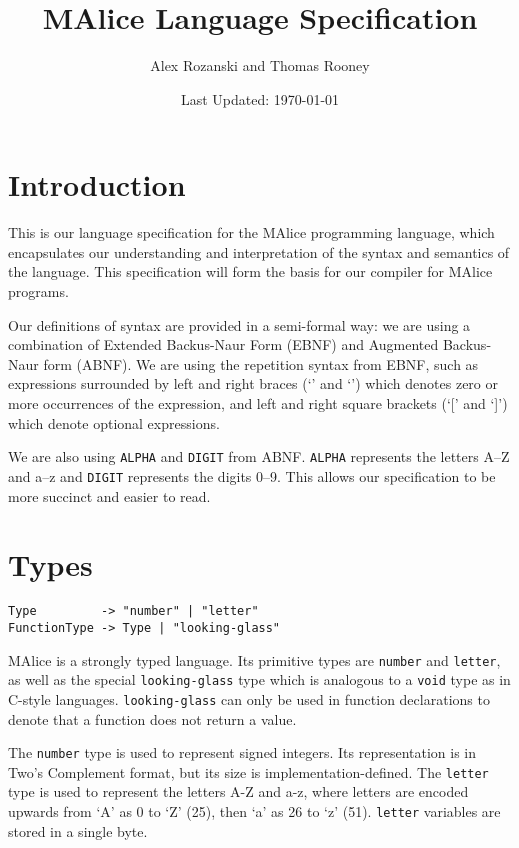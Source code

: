 \documentclass[a4wide, 11pt]{article}
\begin{document}
\title{MAlice Language Specification}

\author{Alex Rozanski and Thomas Rooney}

\date{Last Updated: \today}         %

\maketitle            %

\section{Introduction}

This is our language specification for the MAlice programming language, which encapsulates our understanding and interpretation of the syntax and semantics of the language. This specification will form the basis for our compiler for MAlice programs.

Our definitions of syntax are provided in a semi-formal way: we are using a combination of Extended Backus-Naur Form (EBNF) and Augmented Backus-Naur form (ABNF). We are using the repetition syntax from EBNF, such as expressions surrounded by left and right braces (`{' and `}') which denotes zero or more occurrences of the expression, and left and right square brackets (`[' and `]') which denote optional expressions.

We are also using \texttt{ALPHA} and \texttt{DIGIT} from ABNF. \texttt{ALPHA} represents the letters A--Z and a--z and \texttt{DIGIT} represents the digits 0--9. This allows our specification to be more succinct and easier to read.

\section{Types}

\begin{verbatim}
Type         -> "number" | "letter"
FunctionType -> Type | "looking-glass"
\end{verbatim}

MAlice is a strongly typed language. Its primitive types are \texttt{number} and \texttt{letter}, as well as the special \texttt{looking-glass} type which is analogous to a \texttt{void} type as in C-style languages. \texttt{looking-glass} can only be used in function declarations to denote that a function does not return a value.

The \texttt{number} type is used to represent signed integers. Its representation is in Two's Complement format, but its size is implementation-defined. The \texttt{letter} type is used to represent the letters A-Z and a-z, where letters are encoded upwards from `A' as 0 to `Z' (25), then `a' as 26 to `z' (51). \texttt{letter} variables are stored in a single byte.
\end{document}
